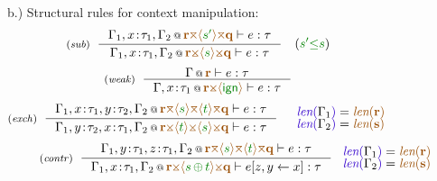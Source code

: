 \begin{figure}[t]
\vspace{1.5em}
{\small b.) Structural rules for context manipulation:}
\begin{equation*}
\tyrule{sub}
  {\coctx{\Gamma_1,x\!:\!\tau_1,\Gamma_2}{\aclrd{\textbf{r}} \azip \alift{\cclrd{s'}} \azip \aclrd{\textbf{q}}} \vdash e : \tau}
  {\coctx{\Gamma_1,x\!:\!\tau_1,\Gamma_2}{\aclrd{\textbf{r}} \apar \alift{\cclrd{s}} \apar \aclrd{\textbf{q}}} \vdash e : \tau}
\quad
(\cclrd{s'} \cleq \cclrd{s})
\end{equation*}
\begin{equation*}
\tyrule{weak}
  {\coctx{\Gamma}{ \aclrd{\textbf{r}} } \vdash e : \tau}
  {\coctx{\Gamma,x \!:\! \tau_1}{\aclrd{\textbf{r}} \apar \alift{ \czero }} \vdash e : \tau} 
\end{equation*}
\begin{equation*}
\tyrule{exch}
  {\coctx{\Gamma_1,x\!:\!\tau_1,y\!:\!\tau_2,\Gamma_2}{\aclrd{\textbf{r}} \azip \alift{\cclrd{s}} \azip \alift{\cclrd{t}} \azip \aclrd{\textbf{q}}} \vdash e : \tau}
  {\coctx{\Gamma_1,y\!:\!\tau_2,x\!:\!\tau_1,\Gamma_2}{\aclrd{\textbf{r}} \apar \alift{\cclrd{t}} \apar \alift{\cclrd{s}} \apar \aclrd{\textbf{q}}} \vdash e : \tau}
\quad
\begin{array}{l}
 \slen{\Gamma_1} = \alen{\aclrd{\textbf{r}}}\\[-0.25em]
 \slen{\Gamma_2} = \alen{\aclrd{\textbf{s}}}
\end{array}
\end{equation*}
\begin{equation*}
\hspace{2.5em} 
\tyrule{contr}
  {\coctx{\Gamma_1,y\!:\!\tau_1,z\!:\!\tau_1,\Gamma_2}{\aclrd{\textbf{r}} \azip \alift{\cclrd{s}} \azip \alift{\cclrd{t}} \azip \aclrd{\textbf{q}}} \vdash e : \tau}
  {\coctx{\Gamma_1,x\!:\!\tau_1,\Gamma_2}{\aclrd{\textbf{r}} \apar \alift{\cclrd{s} \,\cpar\, \cclrd{t}} \apar \aclrd{\textbf{q}}} \vdash \subst{e}{z,y}{x} : \tau}
~
\begin{array}{l}
 \slen{\Gamma_1} = \alen{\aclrd{\textbf{r}}}\\[-0.25em]
 \slen{\Gamma_2} = \alen{\aclrd{\textbf{s}}}
\end{array}
\end{equation*}

\vspace{0.5em}
\label{fig:unif-types}
\end{figure}


